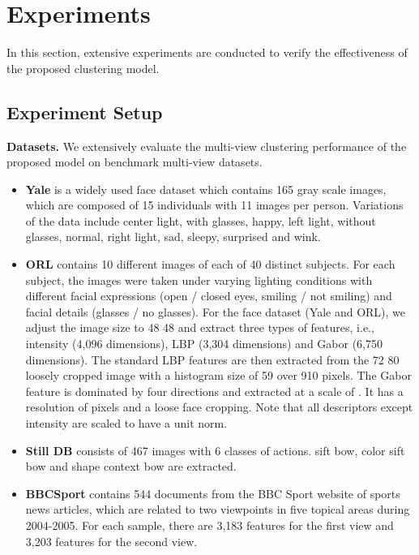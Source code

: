 \documentclass[journal]{IEEEtran}
\begin{document}
\section{Experiments}
\label{s4}
In this section, extensive experiments are conducted to verify the effectiveness of the proposed clustering model.


\subsection{Experiment Setup}

\textbf{Datasets.}
We extensively evaluate the multi-view clustering performance of the proposed model on benchmark multi-view datasets.
\begin{itemize}
  \item  {\textbf{Yale}} is a widely used face dataset which contains 165 gray scale images, which are composed of 15 individuals with 11 images per person.
Variations of the data include center light, with glasses, happy, left light, without glasses, normal, right light, sad, sleepy, surprised and wink.
  \item {\textbf{ORL}} contains 10 different images of each of 40 distinct subjects.
For each subject, the images were taken under varying lighting conditions with different facial expressions (open / closed eyes, smiling / not smiling) and facial details (glasses / no glasses).
For the face dataset (Yale and ORL),  we adjust the image size to 48  48 and extract three types of features, i.e., intensity (4,096 dimensions), LBP (3,304 dimensions) and Gabor (6,750 dimensions).
The standard LBP features are then extracted from the 72   80 loosely cropped image with a histogram size of 59 over 910 pixels.
The Gabor feature is dominated by four directions  and extracted at a scale of . It has a resolution of  pixels and a loose face cropping.
Note that all descriptors except intensity are scaled to have a unit norm.
  \item {\textbf{Still DB}} consists of 467 images with 6 classes of actions.
sift bow, color sift bow and shape context bow are extracted.
  \item {\textbf{BBCSport}} contains 544 documents from the BBC Sport website of sports news articles, which are related to two viewpoints in five topical areas during 2004-2005. For each sample, there are 3,183 features for the first view and 3,203 features for the second view.
\end{itemize}
\end{document}

